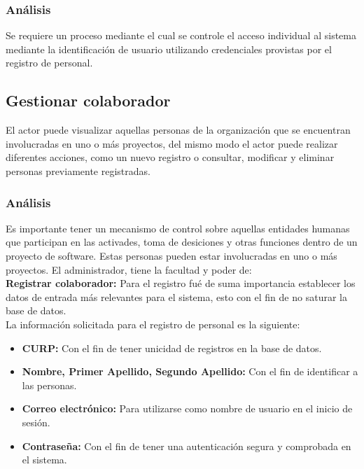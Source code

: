 \subsubsection {Análisis}
Se requiere un proceso mediante el cual se controle el acceso individual al sistema mediante la identificación de usuario utilizando credenciales provistas por el registro de personal.\\

\subsection{Gestionar colaborador}
El actor puede visualizar aquellas personas de la organización que se encuentran involucradas en uno o más proyectos, del  mismo modo el actor puede realizar diferentes acciones, como un nuevo registro o consultar, modificar y eliminar personas previamente registradas.

\subsubsection {Análisis}
Es importante tener un mecanismo de control sobre aquellas entidades humanas que participan en las activades, toma de desiciones y otras funciones dentro de un proyecto de software. Estas personas pueden estar involucradas en uno o más proyectos.
\bigskip
El administrador, tiene la facultad y poder de:\\

\textbf {Registrar colaborador:} Para el registro fué de suma importancia establecer los datos de entrada más relevantes para el sistema, esto con el fin de no saturar la base de datos.\\

La información solicitada para el registro de personal es la siguiente:

\begin{itemize}
	\item \textbf{CURP:} Con el fin de tener unicidad de registros en la base de datos.
	\item \textbf{Nombre, Primer Apellido, Segundo Apellido:} Con el fin de identificar a las personas.
	\item \textbf{Correo electrónico:} Para utilizarse como nombre de usuario en el inicio de sesión.
	\item \textbf{Contraseña:} Con el fin de tener una autenticación segura y comprobada en el sistema.
\end{itemize}

